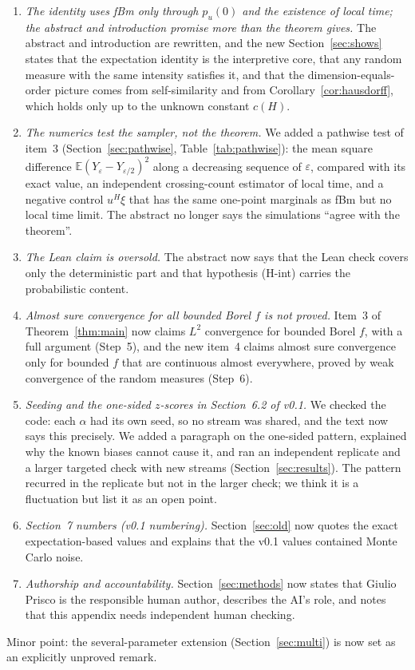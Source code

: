 \documentclass[11pt]{article}
\theoremstyle{remark}
\theoremstyle{definition}
\newcommand{\E}{\mathbb{E}}
\begin{document}
\begin{enumerate}
\item \emph{The identity uses fBm only through $p_u(0)$ and the existence of local time; the abstract and introduction promise more than the theorem gives.} The abstract and introduction are rewritten, and the new Section~\ref{sec:shows} states that the expectation identity is the interpretive core, that any random measure with the same intensity satisfies it, and that the dimension-equals-order picture comes from self-similarity and from Corollary~\ref{cor:hausdorff}, which holds only up to the unknown constant $c(H)$.
\item \emph{The numerics test the sampler, not the theorem.} We added a pathwise test of item~3 (Section~\ref{sec:pathwise}, Table~\ref{tab:pathwise}): the mean square difference $\E(Y_\varepsilon-Y_{\varepsilon/2})^2$ along a decreasing sequence of $\varepsilon$, compared with its exact value, an independent crossing-count estimator of local time, and a negative control $u^H\xi$ that has the same one-point marginals as fBm but no local time limit. The abstract no longer says the simulations ``agree with the theorem''.
\item \emph{The Lean claim is oversold.} The abstract now says that the Lean check covers only the deterministic part and that hypothesis (H-int) carries the probabilistic content.
\item \emph{Almost sure convergence for all bounded Borel $f$ is not proved.} Item~3 of Theorem~\ref{thm:main} now claims $L^2$ convergence for bounded Borel $f$, with a full argument (Step~5), and the new item~4 claims almost sure convergence only for bounded $f$ that are continuous almost everywhere, proved by weak convergence of the random measures (Step~6).
\item \emph{Seeding and the one-sided $z$-scores in Section~6.2 of v0.1.} We checked the code: each $\alpha$ had its own seed, so no stream was shared, and the text now says this precisely. We added a paragraph on the one-sided pattern, explained why the known biases cannot cause it, and ran an independent replicate and a larger targeted check with new streams (Section~\ref{sec:results}). The pattern recurred in the replicate but not in the larger check; we think it is a fluctuation but list it as an open point.
\item \emph{Section~7 numbers (v0.1 numbering).} Section~\ref{sec:old} now quotes the exact expectation-based values and explains that the v0.1 values contained Monte Carlo noise.
\item \emph{Authorship and accountability.} Section~\ref{sec:methods} now states that Giulio Prisco is the responsible human author, describes the AI's role, and notes that this appendix needs independent human checking.
\end{enumerate}
Minor point: the several-parameter extension (Section~\ref{sec:multi}) is now set as an explicitly unproved remark.
\end{document}
